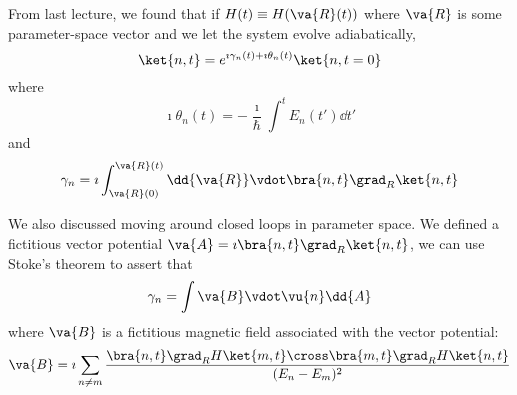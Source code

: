 \documentclass[a4paper,twoside,master.tex]{subfiles}
\begin{document}

From last lecture, we found that if $ H(t) \equiv H(\va{R}(t)) $ where $ \va{R} $ is some parameter-space vector and we let the system evolve adiabatically,
\begin{equation}
    \ket{n, t} = e^{\imath \gamma_n(t) + \imath \theta_n(t)}\ket{n,t=0}
\end{equation}
where
\begin{equation}
    \imath \theta_n(t) = - \frac{\imath}{\hbar} \int^t E_n(t') \dd{t'}
\end{equation}
and
\begin{equation}
    \gamma_n = \imath \int_{\va{R}(0)}^{\va{R}(t)} \dd{\va{R}} \vdot\bra{n,t} \grad_{R}\ket{n,t}
\end{equation}

We also discussed moving around closed loops in parameter space. We defined a fictitious vector potential $ \va{A} = \imath\bra{n,t} \grad_R\ket{n,t} $, we can use Stoke's theorem to assert that
\begin{equation}
    \gamma_n = \int \va{B} \vdot \vu{n} \dd{A}
\end{equation}
where $ \va{B} $ is a fictitious magnetic field associated with the vector potential:
\begin{equation}
    \va{B} = \imath\sum_{n \neq m}\frac{\bra{n,t} \grad_R H\ket{m,t} \cross\bra{m,t} \grad_R H\ket{n,t}}{(E_n - E_m)^2}
\end{equation}
\end{document}
